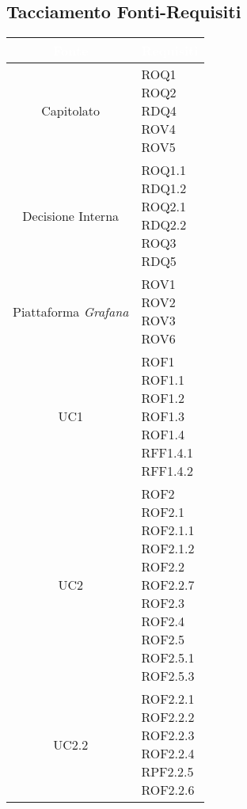 \subsection{Tacciamento Fonti-Requisiti}\label{Tracciamento}
\begin{center}
\begin{longtable}[c]{|c|m{}|}
\hline
\rowcolor{bluelogo}\textbf{\textcolor{white}{Fonte}} & \textbf{\textcolor{white}{Requisiti}}\\
\hline \hline
\endhead
Capitolato & \makecell{ROQ1\\ROQ2\\RDQ4\\ROV4\\ROV5}\\
\hline
\rowcolor{grigio}Decisione Interna & \makecell{ROQ1.1\\RDQ1.2\\ROQ2.1\\RDQ2.2\\ROQ3\\RDQ5}\\
\hline
Piattaforma \textit{Grafana} & \makecell{ROV1\\ROV2\\ROV3\\ROV6}\\
\hline
\rowcolor{grigio}UC1 & \makecell{ROF1\\ROF1.1\\ROF1.2\\ROF1.3\\ROF1.4\\RFF1.4.1\\RFF1.4.2}\\
\hline
UC2 & \makecell{ROF2\\ROF2.1\\ROF2.1.1\\ROF2.1.2\\ROF2.2\\ROF2.2.7\\ROF2.3\\ROF2.4\\ROF2.5\\ROF2.5.1\\ROF2.5.3}\\
\hline
\rowcolor{grigio}UC2.2 & \makecell{ROF2.2.1\\ROF2.2.2\\ROF2.2.3\\ROF2.2.4\\RPF2.2.5\\ROF2.2.6}\\

\end{longtable}
\end{center}
